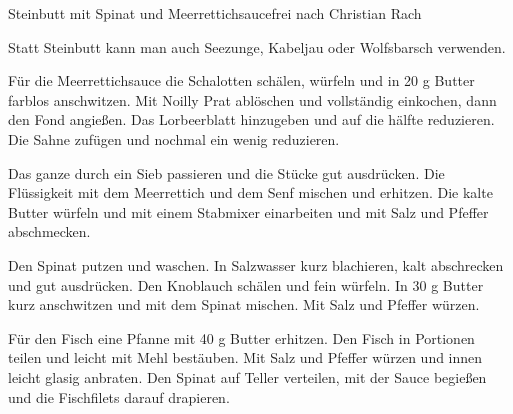 \begin{recipe}{Steinbutt mit Spinat und Meerrettichsauce}{frei nach Christian Rach}



  \steps

  Statt Steinbutt kann man auch Seezunge, Kabeljau oder Wolfsbarsch verwenden.

  Für die Meerrettichsauce die Schalotten schälen, würfeln und in 20 g Butter
  farblos anschwitzen. Mit Noilly Prat ablöschen und vollständig einkochen,
  dann den Fond angießen. Das Lorbeerblatt hinzugeben und auf die hälfte
  reduzieren. Die Sahne zufügen und nochmal ein wenig reduzieren.
  
  Das ganze durch ein Sieb passieren und die Stücke gut ausdrücken. Die
  Flüssigkeit mit dem Meerrettich und dem Senf mischen und erhitzen. Die kalte
  Butter würfeln und mit einem Stabmixer einarbeiten und mit Salz und Pfeffer
  abschmecken.
  
  Den Spinat putzen und waschen. In Salzwasser kurz blachieren, kalt abschrecken
  und gut ausdrücken. Den Knoblauch schälen und fein würfeln. In 30 g Butter
  kurz anschwitzen und mit dem Spinat mischen. Mit Salz und Pfeffer würzen.
  
  Für den Fisch eine Pfanne mit 40 g Butter erhitzen. Den Fisch in Portionen
  teilen und leicht mit Mehl bestäuben. Mit Salz und Pfeffer würzen und innen
  leicht glasig anbraten. Den Spinat auf Teller verteilen, mit der Sauce
  begießen und die Fischfilets darauf drapieren.
  
 \end{recipe}
